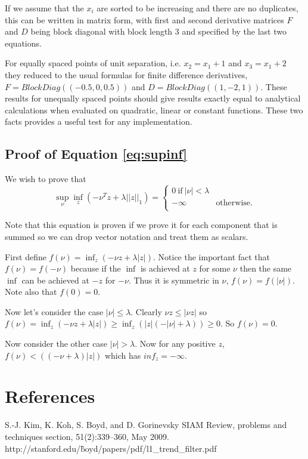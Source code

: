 \documentclass{article}
\begin{document}
If we assume that the $x_i$ are sorted to be increasing and there are no duplicates, this can be
written in matrix form, with first and second derivative matrices $F$ and $D$ being
block diagonal with block length 3 and specified by the last two equations.

For equally spaced points of unit separation, i.e. $x_2 = x_1 +1$ and $x_3 = x_1 + 2$ they reduced to the
usual formulas for finite difference derivatives,
$F = BlockDiag((-0.5,0,0.5))$ and $D = BlockDiag((1,-2,1))$. These results for unequally spaced
points should give results exactly equal to analytical calculations when evaluated on quadratic, linear
or constant functions. These two facts provides a useful test for any implementation.

\subsection{Proof of Equation \ref{eq:supinf}}

We wish to prove that
\begin{equation}
\sup_\nu \inf_z \left(-\nu^T z + \lambda ||z||_1 \right) =
\left\{
    \begin{array}{ll}
   0 ~\mbox{if}~ |\nu| < \lambda \\
  -\infty  & \mbox{otherwise.} \\
  \end{array}
  \right.
\end{equation}

Note that this equation is proven if we prove it for each component that is summed so
we can drop vector notation and treat them as scalars.

First define $f(\nu) = \inf_z \left(-\nu z + \lambda |z| \right)$. Notice the important fact
that $f(\nu) = f(-\nu)$ because if the $\inf$ is achieved at $z$ for some $\nu$ then the same
$\inf$ can be achieved at $-z$ for $-\nu$. Thus it is symmetric in $\nu$, $f(\nu) = f(|\nu|)$.
Note also that $f(0) = 0.$

Now let's consider the case $|\nu| \le \lambda$. Clearly $\nu z \le |\nu z|$ so
$f(\nu) = \inf_z \left(-\nu z + \lambda |z| \right) \ge  \inf_z \left(|z| (-|\nu| + \lambda) \right)
\ge 0$. So $f(\nu) = 0$.

Now consider the other case $|\nu| > \lambda$. Now for any positive $z$,
$f(\nu) < \left((-\nu + \lambda) |z| \right)$ which has $inf_z = -\infty$.


\section{References}
S.-J. Kim, K. Koh, S. Boyd, and D. Gorinevsky
SIAM Review, problems and techniques section, 51(2):339–360, May 2009.\\
http://stanford.edu/\~boyd/papers/pdf/l1\_trend\_filter.pdf
\end{document}
